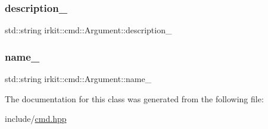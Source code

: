 \subsubsection{\texorpdfstring{description\+\_\+}{description\_}}
{\footnotesize\ttfamily std\+::string irkit\+::cmd\+::\+Argument\+::description\+\_\+\hspace{0.3cm}{\ttfamily [protected]}}

\mbox{\label{classirkit_1_1cmd_1_1Argument_a2201ab317f191bed438cce02d93aade1}} 
\subsubsection{\texorpdfstring{name\+\_\+}{name\_}}
{\footnotesize\ttfamily std\+::string irkit\+::cmd\+::\+Argument\+::name\+\_\+\hspace{0.3cm}{\ttfamily [protected]}}



The documentation for this class was generated from the following file\+:\begin{DoxyCompactItemize}
\item 
include/\mbox{\hyperlink{cmd_8hpp}{cmd.\+hpp}}\end{DoxyCompactItemize}
